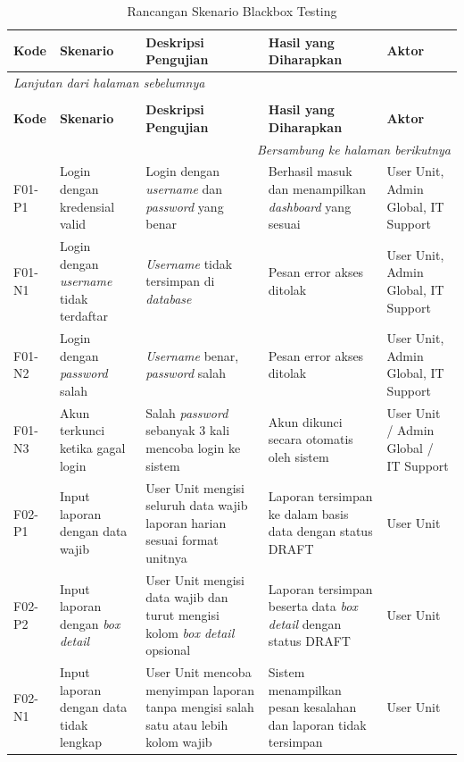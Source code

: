 \begin{longtable}{|p{}|p{}|p{}|p{}|p{}|}
    \caption{Rancangan Skenario Blackbox Testing}
    \label{table:3.blackbox}\\
    \hline
    \textbf{Kode} & \textbf{Skenario} & \textbf{Deskripsi Pengujian} & \textbf{Hasil yang Diharapkan} & \textbf{Aktor} \\
    \hline
    \endfirsthead
    \multicolumn{5}{l}{\textit{Lanjutan dari halaman sebelumnya}} \\
    \caption[]{Rancangan Skenario Blackbox Testing} \\
    \hline
    \textbf{Kode} & \textbf{Skenario} & \textbf{Deskripsi Pengujian} & \textbf{Hasil yang Diharapkan} & \textbf{Aktor} \\
    \hline
    \endhead
    \hline
    \multicolumn{5}{r}{\textit{Bersambung ke halaman berikutnya}} \\
    \endfoot
    \endlastfoot
    F01-P1 & Login dengan kredensial valid & Login dengan \textit{username} dan \textit{password} yang benar & Berhasil masuk dan menampilkan \textit{dashboard} yang sesuai & User Unit, Admin Global, IT Support \\
    \hline
    F01-N1 & Login dengan \textit{username} tidak terdaftar & \textit{Username} tidak tersimpan di \textit{database} & Pesan error akses ditolak & User Unit, Admin Global, IT Support \\
    \hline
    F01-N2 & Login dengan \textit{password} salah & \textit{Username} benar, \textit{password} salah & Pesan error akses ditolak & User Unit, Admin Global, IT Support \\
    \hline
    F01-N3 & Akun terkunci ketika gagal login & Salah \textit{password} sebanyak 3 kali mencoba login ke sistem & Akun dikunci secara otomatis oleh sistem & User Unit / Admin Global / IT Support \\
    \hline
    F02-P1 & Input laporan dengan data wajib & User Unit mengisi seluruh data wajib laporan harian sesuai format unitnya & Laporan tersimpan ke dalam basis data dengan status DRAFT & User Unit \\
    \hline
    F02-P2 & Input laporan dengan \textit{box detail} & User Unit mengisi data wajib dan turut mengisi kolom \textit{box detail} opsional & Laporan tersimpan beserta data \textit{box detail} dengan status DRAFT & User Unit \\
    \hline
    F02-N1 & Input laporan dengan data tidak lengkap & User Unit mencoba menyimpan laporan tanpa mengisi salah satu atau lebih kolom wajib & Sistem menampilkan pesan kesalahan dan laporan tidak tersimpan & User Unit \\

\end{longtable}
